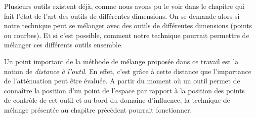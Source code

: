 Plusieurs outils existent déjà, comme nous avons pu le voir dans le chapitre
qui fait l'état de l'art des outils de différentes dimensions. On se demande
alors si notre technique peut se mélanger avec des outils de différentes
dimensions (points ou courbes). Et si c'est possible, comment notre technique
pourrait permettre de mélanger ces différents outils ensemble.

Un point important de la méthode de mélange proposée dans ce travail est la
notion de \textit{distance à l'outil}. En effet, c'est grâce à cette distance
que l'importance de l'atténuation peut être évaluée. A partir du moment où un
outil permet de connaître la position d'un point de l'espace par rapport à la
position des points de contrôle de cet outil et au bord du domaine
d'influence, la technique de mélange présentée au chapitre précédent pourrait
fonctionner.